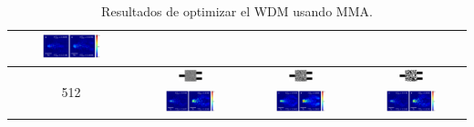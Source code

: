 \begin{landscape}
\begin{table}[ht]
\begin{tabular}{|c|c|c|c|}
      \includegraphics[width=0.50\textwidth]{image/results/wdm/MMA/visualize_field_fab_256.png} \\
    \hline
      \multirow{2}{*}{512} &
      \includegraphics[width=0.24\textwidth]{image/results/wdm/MMA/visualize_eps_cont_512.png} &
      \includegraphics[width=0.24\textwidth]{image/results/wdm/MMA/visualize_eps_disc_512.png} &
      \includegraphics[width=0.24\textwidth]{image/results/wdm/MMA/visualize_eps_fab_512.png} \\
      \cline{2-4}
      &
      \includegraphics[width=0.50\textwidth]{image/results/wdm/MMA/visualize_field_cont_512.png} &
      \includegraphics[width=0.50\textwidth]{image/results/wdm/MMA/visualize_field_disc_512.png} &
      \includegraphics[width=0.50\textwidth]{image/results/wdm/MMA/visualize_field_fab_512.png} \\
    \hline
    \end{tabular}
    \hspace*{-5cm}
    \caption{Resultados de optimizar el WDM usando MMA.}
    \label{tab:opt-MMA-wdm}
\end{table}
\end{landscape}

